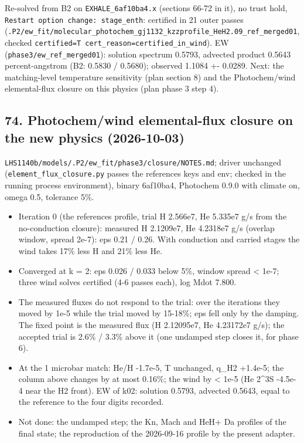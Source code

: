 \documentclass[english,a4paper]{my_memo}
\providecommand{\tightlist}{\setlength{\itemsep}{0pt}\setlength{\parskip}{0pt}}
\begin{document}
Re-solved from B2 on \texttt{EXHALE\_6af10ba4.x} (sections 66-72 in it), no trust
hold, \texttt{Restart\ option\ change:\ stage\_enth}: certified in 21 outer passes
(\texttt{.P2/ew\_fit/molecular\_photochem\_gj1132\_kzzprofile\_HeH2.09\_ref\_merged01},
checked \texttt{certified=T\ cert\_reason=certified\_in\_wind}). EW
(\texttt{phase3/ew\_ref\_merged01}): solution spectrum 0.5793, advected product
0.5643 percent-angstrom (B2: 0.5830 / 0.5680); observed 1.1084 +- 0.0289.
Next: the matching-level temperature sensitivity (plan section 8) and the
Photochem/wind elemental-flux closure on this physics (plan phase 3 step 4).

\subsection{74. Photochem/wind elemental-flux closure on the new physics (2026-10-03)}\label{74-photochemwind-elemental-flux-closure-on-the-new-physics-2026-10-03}

\texttt{LHS1140b/models/.P2/ew\_fit/phase3/closure/NOTES.md}; driver unchanged
(\texttt{element\_flux\_closure.py} passes the reference\textquotesingle s keys and env; checked in
the running process environment), binary 6af10ba4, Photochem 0.9.0 with
climate on, omega 0.5, tolerance 5\%.

\begin{itemize}
\tightlist
\item
  Iteration 0 (the reference\textquotesingle s profile, trial H 2.566e7, He 5.335e7 g/s from
  the no-conduction closure): measured H 2.1209e7, He 4.2318e7 g/s (overlap
  window, spread 2e-7): eps 0.21 / 0.26. With conduction and carried stages
  the wind takes 17\% less H and 21\% less He.
\item
  Converged at k = 2: eps 0.026 / 0.033 below 5\%, window spread \textless{} 1e-7;
  three wind solves certified (4-6 passes each), log Mdot 7.800.
\item
  The measured fluxes do not respond to the trial: over the iterations they
  moved by 1e-5 while the trial moved by 15-18\%; eps fell only by the
  damping. The fixed point is the measured flux (H 2.12095e7, He 4.23172e7
  g/s); the accepted trial is 2.6\% / 3.3\% above it (one undamped step
  closes it, for phase 6).
\item
  At the 1 microbar match: He/H -1.7e-5, T unchanged, q\_H2 +1.4e-5; the
  column above changes by at most 0.16\%; the wind by \textless{} 1e-5 (He 2\^{}3S
  -4.5e-4 near the H2 front). EW of k02: solution 0.5793, advected 0.5643,
  equal to the reference to the four digits recorded.
\item
  Not done: the undamped step; the Kn, Mach and HeH+ Da profiles of the
  final state; the reproduction of the 2026-09-16 profile by the present
  adapter.
\end{itemize}
\end{document}
